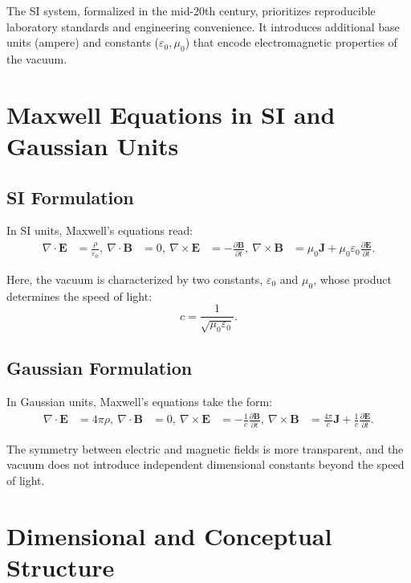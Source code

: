 \documentclass[12pt]{article}
\begin{document}
The SI system, formalized in the mid-20th century, prioritizes reproducible laboratory standards and engineering convenience. It introduces additional base units (ampere) and constants ($\varepsilon_0, \mu_0$) that encode electromagnetic properties of the vacuum.

\section{Maxwell Equations in SI and Gaussian Units}

\subsection{SI Formulation}

In SI units, Maxwell’s equations read:
\begin{align}
\nabla \cdot \mathbf{E} &= \frac{\rho}{\varepsilon_0}, \
\nabla \cdot \mathbf{B} &= 0, \
\nabla \times \mathbf{E} &= -\frac{\partial \mathbf{B}}{\partial t}, \
\nabla \times \mathbf{B} &= \mu_0 \mathbf{J} + \mu_0 \varepsilon_0 \frac{\partial \mathbf{E}}{\partial t}.
\end{align}

Here, the vacuum is characterized by two constants, $\varepsilon_0$ and $\mu_0$, whose product determines the speed of light:
\[
c = \frac{1}{\sqrt{\mu_0 \varepsilon_0}}.
\]

\subsection{Gaussian Formulation}

In Gaussian units, Maxwell’s equations take the form:
\begin{align}
\nabla \cdot \mathbf{E} &= 4\pi \rho, \
\nabla \cdot \mathbf{B} &= 0, \
\nabla \times \mathbf{E} &= -\frac{1}{c}\frac{\partial \mathbf{B}}{\partial t}, \
\nabla \times \mathbf{B} &= \frac{4\pi}{c} \mathbf{J} + \frac{1}{c}\frac{\partial \mathbf{E}}{\partial t}.
\end{align}

The symmetry between electric and magnetic fields is more transparent, and the vacuum does not introduce independent dimensional constants beyond the speed of light.

\section{Dimensional and Conceptual Structure}
\end{document}
